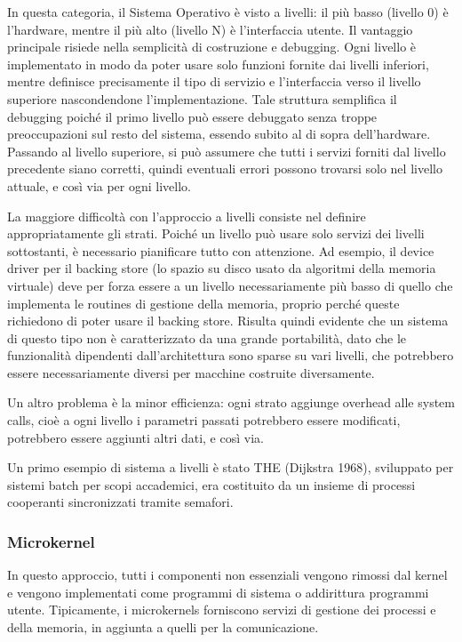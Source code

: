 \documentclass[a4]{article}
\begin{document}
In questa categoria, il Sistema Operativo è visto a livelli: il più basso (livello 0) è l'hardware, mentre il più alto (livello N) è l'interfaccia utente.
Il vantaggio principale risiede nella semplicità di costruzione e debugging. Ogni livello è implementato in modo da poter usare solo funzioni fornite dai livelli inferiori, mentre definisce precisamente il tipo di servizio e l'interfaccia verso il livello superiore nascondendone l'implementazione. Tale struttura semplifica il debugging poiché il primo livello può essere debuggato senza troppe preoccupazioni sul resto del sistema, essendo subito al di sopra dell'hardware. Passando al livello superiore, si può assumere che tutti i servizi forniti dal livello precedente siano corretti, quindi eventuali errori possono trovarsi solo nel livello attuale, e così via per ogni livello.

La maggiore difficoltà con l'approccio a livelli consiste nel definire appropriatamente gli strati. Poiché un livello può usare solo servizi dei livelli sottostanti, è necessario pianificare tutto con attenzione. Ad esempio, il device driver per il backing store (lo spazio su disco usato da algoritmi della memoria virtuale) deve per forza essere a un livello necessariamente più basso di quello che implementa le routines di gestione della memoria, proprio perché queste richiedono di poter usare il backing store. Risulta quindi evidente che un sistema di questo tipo non è caratterizzato da una grande portabilità, dato che le funzionalità dipendenti dall'architettura sono sparse su vari livelli, che potrebbero essere necessariamente diversi per macchine costruite diversamente.

Un altro problema è la minor efficienza: ogni strato aggiunge overhead alle system calls, cioè a ogni livello i parametri passati potrebbero essere modificati, potrebbero essere aggiunti altri dati, e così via.

Un primo esempio di sistema a livelli è stato THE (Dijkstra 1968), sviluppato per sistemi batch per scopi accademici, era costituito da un insieme di processi cooperanti sincronizzati tramite semafori.

\subsubsection{Microkernel}
In questo approccio, tutti i componenti non essenziali vengono rimossi dal kernel e vengono implementati come programmi di sistema o addirittura programmi utente. Tipicamente, i microkernels forniscono servizi di gestione dei processi e della memoria, in aggiunta a quelli per la comunicazione.
\end{document}
